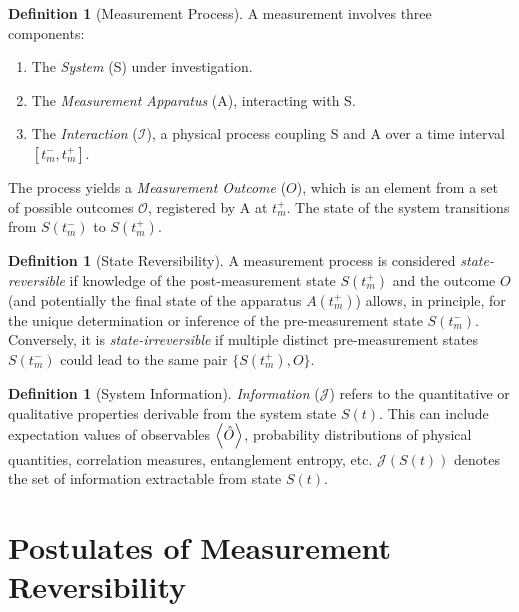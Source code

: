 \documentclass[11pt, a4paper]{article}
\theoremstyle{plain} %
\theoremstyle{definition} %
\newtheorem{definition}[theorem]{Definition}
\theoremstyle{remark} %
\newcommand{\Interaction}{\mathcal{I}} %
\newcommand{\Outcome}{\mathcal{O}} %
\newcommand{\Info}{\mathcal{J}} %
\newcommand{\TimePre}{t_m^-} %
\newcommand{\TimePost}{t_m^+} %
\newcommand{\StatePre}{S(\TimePre)} %
\newcommand{\StatePost}{S(\TimePost)} %
\newcommand{\OutcomeVal}{O} %
\begin{document}
	\begin{definition}[Measurement Process]
		A measurement involves three components:
		\begin{enumerate}
			\item The \emph{System} (S) under investigation.
			\item The \emph{Measurement Apparatus} (A), interacting with S.
			\item The \emph{Interaction} ($\Interaction$), a physical process coupling S and A over a time interval $[\TimePre, \TimePost]$.
		\end{enumerate}
		The process yields a \emph{Measurement Outcome} ($\OutcomeVal$), which is an element from a set of possible outcomes $\Outcome$, registered by A at $\TimePost$. The state of the system transitions from $\StatePre$ to $\StatePost$.
	\end{definition}
	
	\begin{definition}[State Reversibility]
		A measurement process is considered \emph{state-reversible} if knowledge of the post-measurement state $\StatePost$ and the outcome $\OutcomeVal$ (and potentially the final state of the apparatus $A(\TimePost)$) allows, in principle, for the unique determination or inference of the pre-measurement state $\StatePre$. Conversely, it is \emph{state-irreversible} if multiple distinct pre-measurement states $\StatePre$ could lead to the same pair $\{\StatePost, \OutcomeVal\}$.
	\end{definition}
	
	\begin{definition}[System Information]
		\emph{Information} ($\Info$) refers to the quantitative or qualitative properties derivable from the system state $S(t)$. This can include expectation values of observables $\expval{\hat{O}}$, probability distributions of physical quantities, correlation measures, entanglement entropy, etc. $\Info(S(t))$ denotes the set of information extractable from state $S(t)$.
	\end{definition}
	
	
	\section{Postulates of Measurement Reversibility}
	
\end{document}

